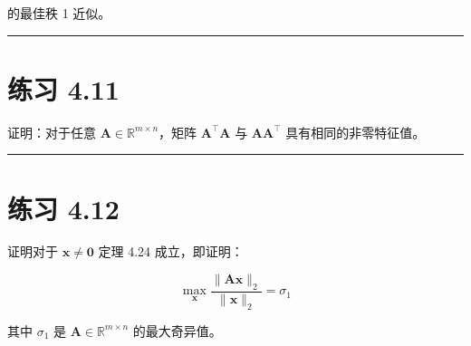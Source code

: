 的最佳秩 1 近似。

\medskip\hrule\medskip

\section*{练习 4.11}

证明：对于任意 $ \boldsymbol{A} \in \mathbb{R}^{m \times n} $，矩阵 $ \boldsymbol{A}^\top \boldsymbol{A} $ 与 $ \boldsymbol{A} \boldsymbol{A}^\top $ 具有相同的非零特征值。

\medskip\hrule\medskip

\section*{练习 4.12}

证明对于 $ \boldsymbol{x} \neq \boldsymbol{0} $ 定理 4.24 成立，即证明：

\begin{equation*}
\max_{\boldsymbol{x}} \frac{\|\boldsymbol{A} \boldsymbol{x}\|_2}{\|\boldsymbol{x}\|_2} = \sigma_1
\end{equation*}

其中 $ \sigma_1 $ 是 $ \boldsymbol{A} \in \mathbb{R}^{m \times n} $ 的最大奇异值。
